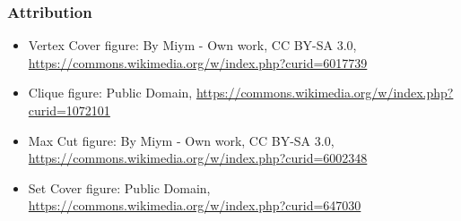 \documentclass[12pt,aspectratio=169]{beamer}
\begin{document}


\begin{frame}\frametitle{Attribution}
\small
  \begin{itemize}[<.->]
  \item
    Vertex Cover figure: By Miym - Own work, CC BY-SA 3.0,
    \url{https://commons.wikimedia.org/w/index.php?curid=6017739}
  \item
    Clique figure: Public Domain,
    \url{https://commons.wikimedia.org/w/index.php?curid=1072101}
  \item
    Max Cut figure: By Miym - Own work, CC BY-SA 3.0,
    \url{https://commons.wikimedia.org/w/index.php?curid=6002348}
  \item
    Set Cover figure: Public Domain, \url{https://commons.wikimedia.org/w/index.php?curid=647030}
  \end{itemize}
\end{frame}
\end{document}
